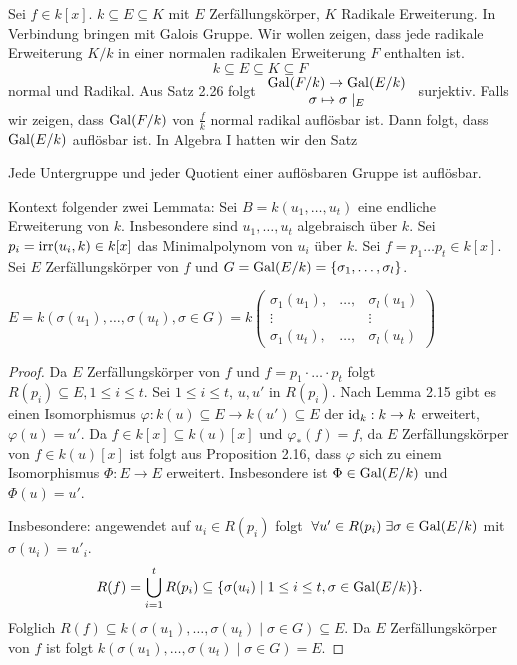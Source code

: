 Sei $f \in k[x]$. $k \subseteq E \subseteq K$ mit $E$ Zerfällungskörper, $K$ Radikale Erweiterung. 
In Verbindung bringen mit Galois Gruppe.
Wir wollen zeigen, dass jede radikale Erweiterung $K / k$ in einer normalen radikalen Erweiterung $F$ enthalten ist.
\[
k \subseteq E \subseteq K \subseteq F
\] 
normal und Radikal. Aus Satz 2.26 folgt $\begin{array}{c} \operatorname{Gal}(F / k) \to \operatorname{Gal}( E / k)\\ \sigma \mapsto \sigma \mid_{E}\\ \end{array}$ surjektiv.
Falls wir zeigen, dass $\operatorname{Gal}(F / k)$ von $\frac{f}{k}$ normal radikal auflösbar ist.
Dann folgt, dass $\operatorname{Gal}(E / k)$ auflösbar ist.
In Algebra I hatten wir den Satz
\begin{theorem}
	Jede Untergruppe und jeder Quotient einer auflösbaren Gruppe ist auflösbar.
\end{theorem}

Kontext folgender zwei Lemmata: Sei $B = k(u_1,\ldots,u_{t})$ eine endliche Erweiterung von $k$.
Insbesondere sind $u_1,\ldots,u_{t}$ algebraisch über $k$.
Sei $p_{i} = \operatorname{irr}(u_{i},k) \in k[x]$ das Minimalpolynom von $u_{i}$ über $k$.
Sei $f = p_1 \ldots p_{t} \in k[x]$. Sei $E$ Zerfällungskörper von $f$ und $G = \operatorname{Gal}(E / k) = \{\sigma_1,\ldots,\sigma_{l}\}	$.

\begin{lemma}
	$E = k(\sigma(u_1),\ldots,\sigma(u_{t}), \sigma \in G) = k \begin{pmatrix} 
		\sigma_1(u_1), &\ldots, &\sigma_{l}(u_1)\\
		\vdots & &\vdots\\
		\sigma_1(u_{t}), &\ldots, &\sigma_{l}(u_{t})
	\end{pmatrix} $
\end{lemma}

\begin{proof}
	Da $E$ Zerfällungskörper von $f$ und $f = p_1 \cdot \ldots\cdot p_{t}$ folgt $R(p_{i}) \subseteq E, 1 \leq i \leq t$.
	Sei $1 \leq i \leq t$, $u, u'$ in $R(p_{i})$. Nach Lemma 2.15 gibt es einen Isomorphismus $\varphi: k(u) \subseteq E \to k(u') \subseteq E$ 
	der $\operatorname{id}_{k}: k \to k$ erweitert, $\varphi(u) = u'$.
	Da $f \in k[x] \subseteq k(u)[x]$ und $\varphi_{*}(f) = f$, da $E$ Zerfällungskörper von $f \in k(u)[x]$ ist
	folgt aus Proposition 2.16, dass $\varphi$ sich zu einem Isomorphismus $\Phi: E \to E$ erweitert.
	Insbesondere ist $\Phi \in \operatorname{Gal}(E / k)$ und $\Phi(u) = u'$.

	Insbesondere: angewendet auf $u_{i} \in R(p_{i})$ folgt $\forall u' \in R(p_{i}) \exists \sigma \in \gal(E / k)$ mit $\sigma(u_{i}) = u'_{i}$.
	\[
		R(f) = \bigcup_{i=1}^{t} R(p_{i}) \subseteq \{\sigma(u_{i}) \mid 1\leq i \leq t, \sigma \in \operatorname{Gal}(E / k)\} 
	.\] 
	Folglich $R(f) \subseteq k(\sigma(u_1),\ldots,\sigma(u_{t}) \mid \sigma \in G) \subseteq E$.
	Da $E$ Zerfällungskörper von $f$ ist folgt $k(\sigma(u_1),\ldots,\sigma(u_{t}) \mid \sigma \in G) = E$.
\end{proof}

